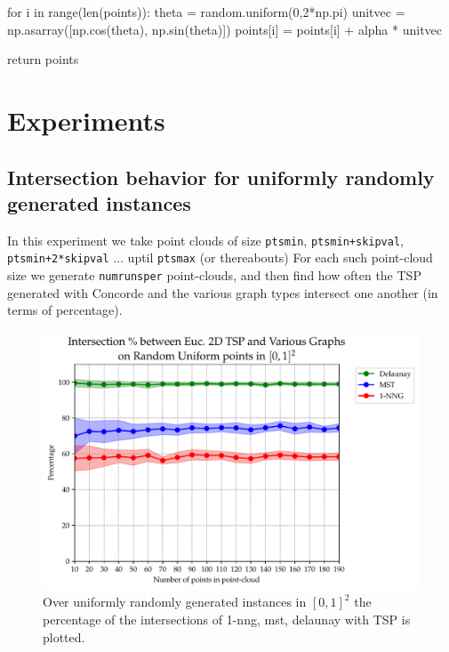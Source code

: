      for i in range(len(points)):
         theta     = random.uniform(0,2*np.pi)
         unitvec   = np.asarray([np.cos(theta), np.sin(theta)])
         points[i] = points[i] + alpha * unitvec

     return points
\nwendcode{}\nwdocspar



\section{Experiments}
\subsection{Intersection behavior for uniformly randomly generated instances}



In this experiment we take point clouds of size \verb|ptsmin|, \verb|ptsmin+skipval|, \verb|ptsmin+2*skipval| $\ldots$ uptil \verb|ptsmax| (or thereabouts) 
For each such point-cloud  size we generate \verb|numrunsper| point-clouds, and then find how often the 
TSP generated with Concorde and the various graph types intersect one another (in terms of percentage).

\begin{figure}[ht]
  \centering
  \includegraphics[width=18cm]{./exptimages/expt_intersection_behavior.pdf}
  \caption{\label{fig:interscn} Over uniformly randomly generated instances in $[0,1]^2$ the percentage of the intersections of 1-nng, mst, delaunay with TSP is plotted. }
\end{figure}

